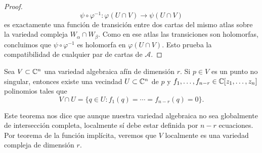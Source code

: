 \begin{proof}
	\begin{equation*}
		  	\psi\circ\varphi^{-1}:\varphi(U\cap V)\longrightarrow \psi(U\cap V)
	\end{equation*} 
	es exactamente una función de transición entre dos cartas del mismo atlas sobre la variedad compleja $W_\alpha\cap W_\beta$. Como en ese atlas las transiciones son holomorfas, concluimos que $\psi\circ\varphi^{-1}$ es holomorfa en $\varphi(U\cap V)$. Esto prueba la compatibilidad de cualquier par de cartas de $\mathcal{A}$.
\end{proof}

\begin{theorem}\parencite[Teo. 3.37]{carlosga}\label{teocarlos}
	Sea $V\subset\mathbb{C}^n$ una variedad algebraica afín de dimensión $r$. Si $p\in V$ es un punto no singular, entonces existe una vecindad $U\subset \mathbb{C}^n$ de $p$ y $f_1,\dots,f_{n-r}\in\mathbb{C}[z_1,\dots,z_n]$ polinomios tales que 
	\begin{equation*}
		V\cap U=\{q\in U:f_1(q)=\cdots=f_{n-r}(q)=0\}.
	\end{equation*}
\end{theorem}

Este teorema nos dice que aunque nuestra variedad algebraica no sea globalmente de intersección completa, localmente sí debe estar definida por $n-r$ ecuaciones. Por teorema de la función implícita, veremos que $V$ localmente es una variedad compleja de dimensión $r$.

